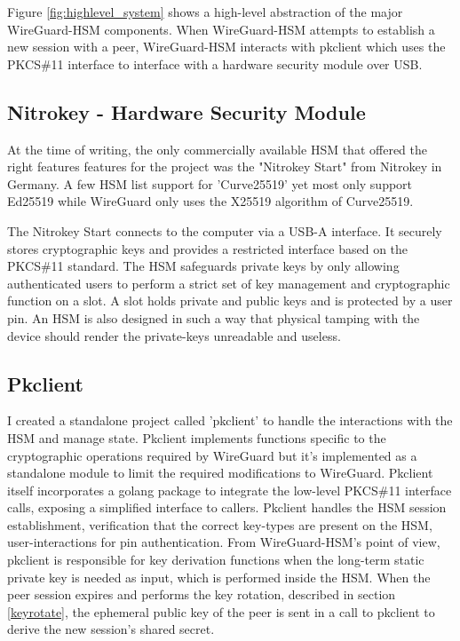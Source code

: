\documentclass [11pt, proquest] {uwthesis}[2020/02/24]
\begin{document}
Figure \ref{fig:highlevel_system} shows a high-level abstraction of the major WireGuard-HSM components. When WireGuard-HSM attempts to establish a new session with a peer, WireGuard-HSM interacts with pkclient which uses the PKCS\#11 interface to interface with a hardware security module over USB. 

\subsection{Nitrokey - Hardware Security Module}

At the time of writing, the only commercially available HSM that offered the right features features for the project was the "Nitrokey Start" from Nitrokey in Germany\cite{noauthor_nitrokey_2022}. A few HSM list support for 'Curve25519' yet most only support Ed25519 while WireGuard only uses the X25519 algorithm of Curve25519.

The Nitrokey Start connects to the computer via a USB-A interface. It securely stores cryptographic keys and provides a restricted interface based on the PKCS\#11 standard.
The HSM safeguards private keys by only allowing authenticated users to perform a strict set of key management and cryptographic function on a slot. A slot holds private and public keys and is protected by a user pin. An HSM is also designed in such a way that physical tamping with the device should render the private-keys unreadable and useless. 

\subsection{Pkclient}
\label{pk_design}
I created a standalone project called 'pkclient' to handle the interactions with the HSM and manage state. Pkclient implements functions specific to the cryptographic operations required by WireGuard but it's implemented as a standalone module to limit the required modifications to WireGuard. Pkclient itself incorporates a golang package to integrate the low-level PKCS\#11 interface calls, exposing a simplified interface to callers.  Pkclient handles the HSM session establishment, verification that the correct key-types are present on the HSM, user-interactions for pin authentication. 
From WireGuard-HSM's point of view, pkclient is responsible for key derivation functions when the long-term static private key is needed as input, which is performed inside the HSM. When the peer session expires and performs the key rotation, described in section \ref{keyrotate}, the ephemeral public key of the peer is sent in a call to pkclient to derive the new session's shared secret. 
\end{document}
